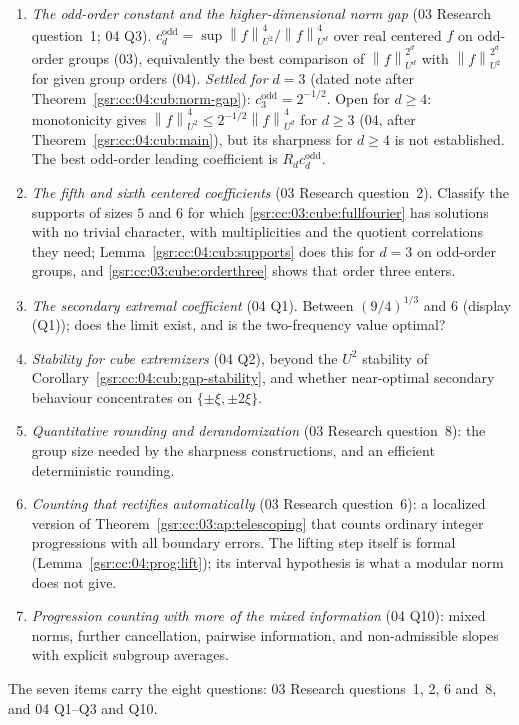 \documentclass[11pt,letterpaper]{article}
\numberwithin{equation}{section}
\theoremstyle{definition}
\theoremstyle{remark}
\newcommand{\1}{\mathbf 1}
\newcommand{\norm}[1]{\left\|#1\right\|}
\begin{document}
\begin{enumerate}[label=\textbf{III.\arabic*},ref=III.\arabic*,leftmargin=2.6em]
\item\label{gsr:fz:q:III:normgap} \emph{The odd-order constant and the higher-dimensional norm gap} (03 Research question~1; 04 Q3). $c_d^{\mathrm{odd}}=\sup\norm f_{U^2}^4/\norm f_{U^d}^4$ over real centered $f$ on odd-order groups (03), equivalently the best comparison of $\norm f_{U^d}^{2^d}$ with $\norm f_{U^2}^{2^d}$ for given group orders (04). \emph{Settled for $d=3$} (dated note after Theorem~\ref{gsr:cc:04:cub:norm-gap}): $c_3^{\mathrm{odd}}=2^{-1/2}$. Open for $d\ge4$: monotonicity gives $\norm f_{U^2}^4\le2^{-1/2}\norm f_{U^d}^4$ for $d\ge3$ (04, after Theorem~\ref{gsr:cc:04:cub:main}), but its sharpness for $d\ge4$ is not established. The best odd-order leading coefficient is $R_dc_d^{\mathrm{odd}}$.
\item\label{gsr:fz:q:III:fifth} \emph{The fifth and sixth centered coefficients} (03 Research question~2). Classify the supports of sizes $5$ and $6$ for which \eqref{gsr:cc:03:cube:fullfourier} has solutions with no trivial character, with multiplicities and the quotient correlations they need; Lemma~\ref{gsr:cc:04:cub:supports} does this for $d=3$ on odd-order groups, and \eqref{gsr:cc:03:cube:orderthree} shows that order three enters.
\item\label{gsr:fz:q:III:second} \emph{The secondary extremal coefficient} (04 Q1). Between $(9/4)^{1/3}$ and $6$ (display (Q1)); does the limit exist, and is the two-frequency value optimal?
\item\label{gsr:fz:q:III:stability} \emph{Stability for cube extremizers} (04 Q2), beyond the $U^2$ stability of Corollary~\ref{gsr:cc:04:cub:gap-stability}, and whether near-optimal secondary behaviour concentrates on $\{\pm\xi,\pm2\xi\}$.
\item\label{gsr:fz:q:III:rounding} \emph{Quantitative rounding and derandomization} (03 Research question~8): the group size needed by the sharpness constructions, and an efficient deterministic rounding.
\item\label{gsr:fz:q:III:rectify} \emph{Counting that rectifies automatically} (03 Research question~6): a localized version of Theorem~\ref{gsr:cc:03:ap:telescoping} that counts ordinary integer progressions with all boundary errors. The lifting step itself is formal (Lemma~\ref{gsr:cc:04:prog:lift}); its interval hypothesis is what a modular norm does not give.
\item\label{gsr:fz:q:III:mixed} \emph{Progression counting with more of the mixed information} (04 Q10): mixed norms, further cancellation, pairwise information, and non-admissible slopes with explicit subgroup averages.
\end{enumerate}
The seven items carry the eight questions: 03 Research questions~1, 2, 6 and~8, and 04 Q1--Q3 and Q10.
\end{document}
